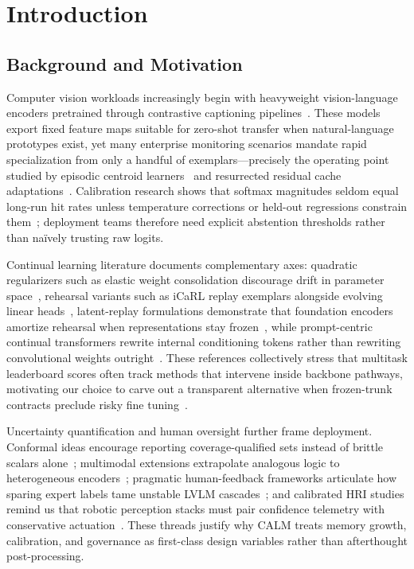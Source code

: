 \documentclass[12pt,a4paper]{report}
\begin{document}
\clearpage
\tableofcontents
\clearpage
\listoffigures
\listoftables
\clearpage

\chapter{Introduction}

\section{Background and Motivation}
Computer vision workloads increasingly begin with heavyweight vision-language encoders pretrained through contrastive captioning pipelines~\cite{r1}. These models export fixed feature maps suitable for zero-shot transfer when natural-language prototypes exist, yet many enterprise monitoring scenarios mandate rapid specialization from only a handful of exemplars---precisely the operating point studied by episodic centroid learners~\cite{r3} and resurrected residual cache adaptations~\cite{r4}. Calibration research shows that softmax magnitudes seldom equal long-run hit rates unless temperature corrections or held-out regressions constrain them~\cite{r5}; deployment teams therefore need explicit abstention thresholds rather than naïvely trusting raw logits.

Continual learning literature documents complementary axes: quadratic regularizers such as elastic weight consolidation discourage drift in parameter space~\cite{r6}, rehearsal variants such as iCaRL replay exemplars alongside evolving linear heads~\cite{r7}, latent-replay formulations demonstrate that foundation encoders amortize rehearsal when representations stay frozen~\cite{r9}, while prompt-centric continual transformers rewrite internal conditioning tokens rather than rewriting convolutional weights outright~\cite{r8,r17}. These references collectively stress that multitask leaderboard scores often track methods that intervene inside backbone pathways, motivating our choice to carve out a transparent alternative when frozen-trunk contracts preclude risky fine tuning~\cite{r16}.

Uncertainty quantification and human oversight further frame deployment. Conformal ideas encourage reporting coverage-qualified sets instead of brittle scalars alone~\cite{r10}; multimodal extensions extrapolate analogous logic to heterogeneous encoders~\cite{r21}; pragmatic human-feedback frameworks articulate how sparing expert labels tame unstable LVLM cascades~\cite{r24}; and calibrated HRI studies remind us that robotic perception stacks must pair confidence telemetry with conservative actuation~\cite{r25}. These threads justify why CALM treats memory growth, calibration, and governance as first-class design variables rather than afterthought post-processing.
\end{document}
